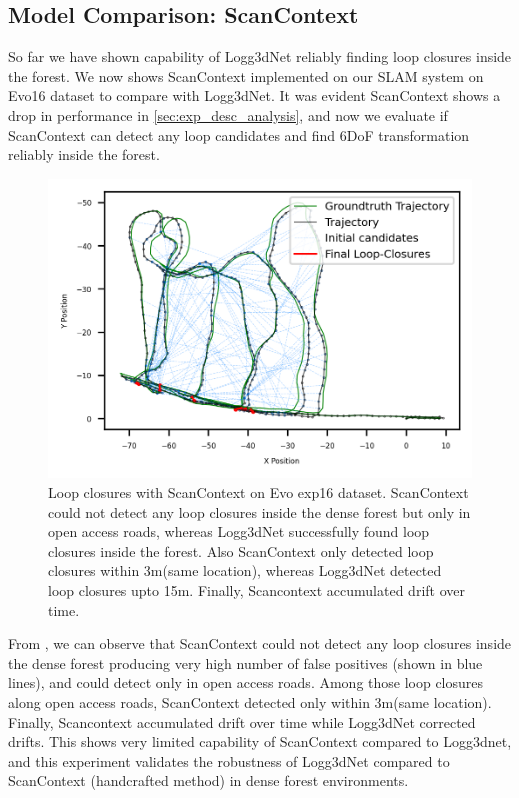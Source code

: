 \subsection*{Model Comparison: ScanContext}
So far we have shown capability of Logg3dNet reliably finding loop closures inside the forest. We now shows ScanContext implemented on our SLAM system on Evo16 dataset to compare with Logg3dNet. It was evident ScanContext shows a drop in performance in \ref{sec:exp_desc_analysis}, and now we evaluate if ScanContext can detect any loop candidates and find 6DoF transformation reliably inside the forest.  
\begin{figure}[htbp]
  \centering
  \includegraphics[width=0.75\columnwidth]{pics/exp_2_sc_loop_closure.png}
  \caption{Loop closures with ScanContext on Evo exp16 dataset. ScanContext could not detect any loop closures inside the dense forest but only in open access roads, whereas Logg3dNet successfully found loop closures inside the forest. Also ScanContext only detected loop closures within 3m(same location), whereas Logg3dNet detected loop closures upto 15m. Finally, Scancontext accumulated drift over time.}
  \label{fig:exp_2_3_loop_closure_comparison}
\end{figure}

From , we can observe that ScanContext could not detect any loop closures inside the dense forest producing very high number of false positives (shown in blue lines), and could detect only in open access roads. Among those loop closures along open access roads, ScanContext detected only within 3m(same location). Finally, Scancontext accumulated drift over time while Logg3dNet corrected drifts. This shows very limited capability of ScanContext compared to Logg3dnet, and this experiment validates the robustness of Logg3dNet compared to ScanContext (handcrafted method) in dense forest environments.



